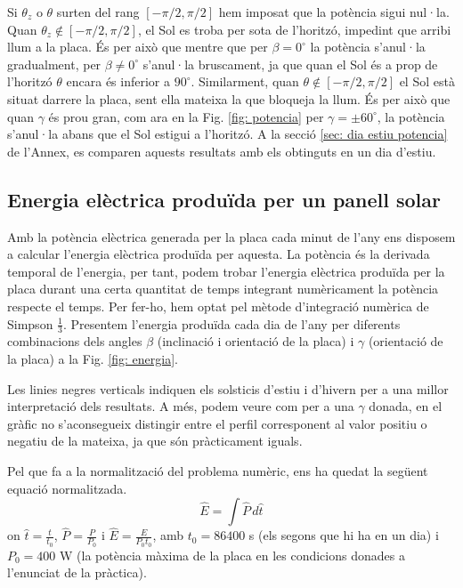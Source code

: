 \documentclass[11pt]{article}
\begin{document}
Si $\theta_z$ o $\theta$ surten del rang $[-\pi/2,\pi/2]$ hem imposat que la potència sigui nul·la. Quan $\theta_z \notin [-\pi/2,\pi/2]$, el Sol es troba per sota de l'horitzó, impedint que arribi llum a la placa. És per això que mentre que per $\beta = 0^{\circ}$ la potència s'anul·la gradualment, per $\beta \neq 0^{\circ}$ s'anul·la bruscament, ja que quan el Sol és a prop de l’horitzó $\theta$ encara és inferior a $90^{\circ}$. Similarment, quan $\theta \notin [-\pi/2,\pi/2]$ el Sol està situat darrere la placa, sent ella mateixa la que bloqueja la llum. És per això que quan $\gamma$ és prou gran, com ara en la Fig. \ref{fig: potencia} per $\gamma=\pm60^{\circ}$, la potència s'anul·la abans que el Sol estigui a l'horitzó. A la secció \ref{sec: dia estiu potencia} de l'Annex, es comparen aquests resultats amb els obtinguts en un dia d'estiu.

\subsection{Energia elèctrica produïda per un panell solar}
Amb la potència elèctrica generada per la placa cada minut de l'any ens disposem a calcular l'energia elèctrica produïda per aquesta. La potència és la derivada temporal de l'energia, per tant, podem trobar l'energia elèctrica produïda per la placa durant una certa quantitat de temps integrant numèricament la potència respecte el temps. Per fer-ho, hem optat pel mètode d'integració numèrica de Simpson $\frac{1}{3}$. Presentem l'energia produïda cada dia de l'any per diferents combinacions dels angles $\beta$ (inclinació i orientació de la placa) i $\gamma$ (orientació de la placa) a la Fig. \ref{fig: energia}.



Les linies negres verticals indiquen els solsticis d'estiu i d'hivern per a una millor interpretació dels resultats. A més, podem veure com per a una $\gamma$ donada, en el gràfic no s'aconsegueix distingir entre el perfil corresponent al valor positiu o negatiu de la mateixa, ja que són pràcticament iguals.

Pel que fa a la normalització del problema numèric, ens ha quedat la següent equació normalitzada.
\begin{equation}
    \hat{E} = \int \hat{P} \, d\hat{t}
    \label{energia}
\end{equation}
on $\hat{t}=\frac{t}{t_0}$, $\hat{P}=\frac{P}{P_0}$ i $\hat{E}=\frac{E}{P_0 t_0}$, amb $t_0=86400$ s (els segons que hi ha en un dia) i $P_0=400$ W (la potència màxima de la placa en les condicions donades a l'enunciat de la pràctica). 
\end{document}
